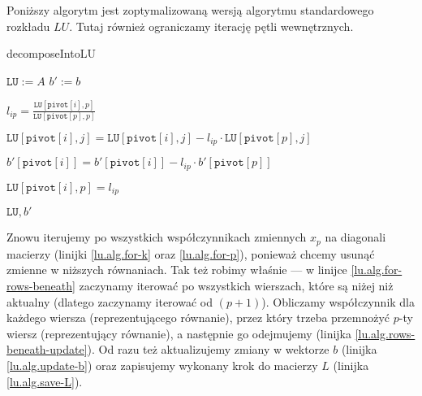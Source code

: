 \documentclass[10pt]{article}
\begin{document}
Poniższy algorytm jest zoptymalizowaną wersją algorytmu standardowego rozkładu $LU$. Tutaj również ograniczamy iterację pętli wewnętrznych.

\begin{algorithm}[H]
    \caption{decomposeIntoLU}
    \begin{algorithmic}[1]
        \State $\texttt{LU} := A$
        \State $b' := b$
        \label{lu.alg.for-k}
            \label{lu.alg.for-p}

                \label{lu.alg.for-rows-beneath}

                    \State $l_{ip} = \frac{\texttt{LU}\left[\texttt{pivot}[i], p\right]}{\texttt{LU}\left[\texttt{pivot}[p], p\right]}$\label{lu.alg.lip}

                    \label{lu.alg.for-rows-beneath-internal}
                        \State $\texttt{LU}\left[\texttt{pivot}[i], j\right] = \texttt{LU}\left[\texttt{pivot}[i], j\right] - l_{ip} \cdot \texttt{LU}\left[\texttt{pivot}[p], j\right]$\label{lu.alg.rows-beneath-update}
                    \EndFor

                    \State $b'\left[\texttt{pivot}[i]\right] = b'\left[\texttt{pivot}[i]\right] - l_{ip} \cdot b'\left[\texttt{pivot}[p]\right]$\label{lu.alg.update-b}

                    \State $\texttt{LU}\left[\texttt{pivot}[i], p\right] = l_{ip}$\label{lu.alg.save-L}

                \EndFor

            \EndFor
        \EndFor
        \State \Return $\texttt{LU}, b'$
    \end{algorithmic}
\end{algorithm}

Znowu iterujemy po wszystkich współczynnikach zmiennych $x_p$ na diagonali macierzy (linijki \ref*{lu.alg.for-k} oraz \ref*{lu.alg.for-p}), ponieważ chcemy usunąć zmienne w niższych równaniach. Tak też robimy właśnie — w linijce \ref*{lu.alg.for-rows-beneath} zaczynamy iterować po wszystkich wierszach, które są niżej niż aktualny (dlatego zaczynamy iterować od $(p+1)$). Obliczamy współczynnik dla każdego wiersza (reprezentującego równanie), przez który trzeba przemnożyć $p$-ty wiersz (reprezentujący równanie), a następnie go odejmujemy (linijka \ref*{lu.alg.rows-beneath-update}). Od razu też aktualizujemy zmiany w wektorze $b$ (linijka \ref*{lu.alg.update-b}) oraz zapisujemy wykonany krok do macierzy $L$ (linijka \ref*{lu.alg.save-L}).
\end{document}
